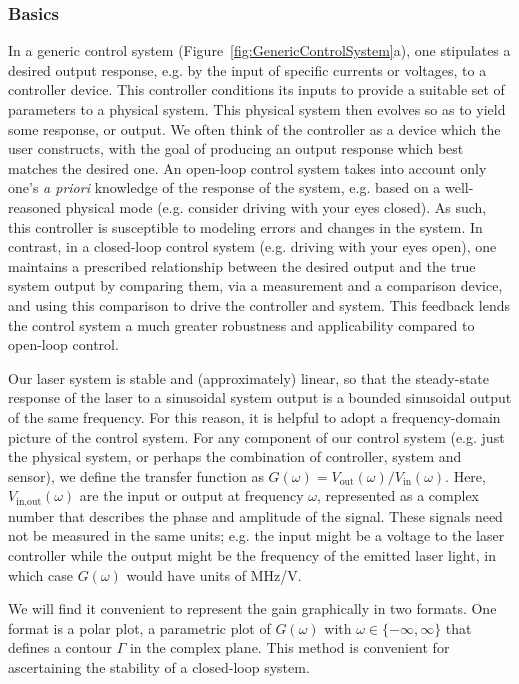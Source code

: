 \documentclass{../lab}
\begin{document}
\subsubsection{Basics}

In a generic control system (Figure~\ref{fig:GenericControlSystem}a), one stipulates a desired output response, e.g. by the input of specific currents or voltages, to a controller device. This controller conditions its inputs to provide a suitable set of parameters to a physical system. This physical system then evolves so as to yield some response, or output. We often think of the controller as a device which the user constructs, with the goal of producing an output response which best matches the desired one. An open-loop control system takes into account only one’s \emph{a priori} knowledge of the response of the system, e.g. based on a well-reasoned physical mode (e.g. consider driving with your eyes closed). As such, this controller is susceptible to modeling errors and changes in the system. In contrast, in a closed-loop control system (e.g. driving with your eyes open), one maintains a prescribed relationship between the desired output and the true system output by comparing them, via a measurement and a comparison device, and using this comparison to drive the controller and system. This feedback lends the control system a much greater robustness and applicability compared to open-loop control.

Our laser system is stable and (approximately) linear, so that the steady-state response of the laser to a sinusoidal system output is a bounded sinusoidal output of the same frequency. For this reason, it is helpful to adopt a frequency-domain picture of the control system. For any component of our control system (e.g. just the physical system, or perhaps the combination of controller, system and sensor), we define the transfer function as $G(\omega) = V_\text{out}(\omega)/V_\text{in}(\omega)$. Here, $V_\text{in,out}(\omega)$ are the input or output at frequency $\omega$, represented as a complex number that describes the phase and amplitude of the signal. These signals need not be measured in the same units; e.g. the input might be a voltage to the laser controller while the output might be the frequency of the emitted laser light, in which case $ G(\omega)$ would have units of MHz/V.

We will find it convenient to represent the gain graphically in two formats. One format is a polar plot, a parametric plot of $G(\omega)$ with $\omega \in \{-\infty, \infty\}$ that defines a contour $\Gamma$ in the complex plane. This method is convenient for ascertaining the stability of a closed-loop system.
\end{document}
